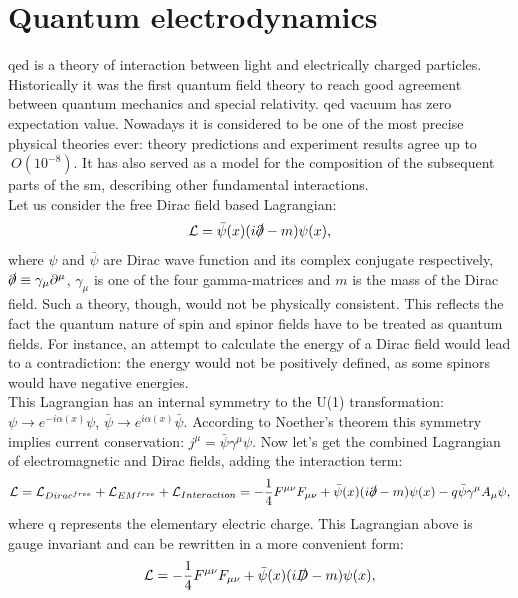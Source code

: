 \section{Quantum electrodynamics}
\label{sec::qed}
\gls{qed} is a theory of interaction between light and electrically charged particles. Historically it was the first quantum field theory to reach good agreement between quantum mechanics and special relativity. \gls{qed} vacuum has zero expectation value.  Nowadays it is considered to be one of the most precise physical theories ever: theory predictions and experiment results agree up to $~O(10^{-8})$. It has also served as a model for the composition of the subsequent parts of the \gls{sm}, describing other fundamental interactions.\\
Let us consider the free Dirac field based Lagrangian:
 \begin{equation}
\mathcal{L} = \bar \psi(x) (i\slashed\partial - m)\psi(x),
\end{equation}
where $\psi$ and $\bar \psi$ are Dirac wave function and its complex conjugate respectively, $\slashed\partial \equiv \gamma_{\mu}\partial^{\mu}$, $\gamma_{\mu}$ is one of the four gamma-matrices and $m$ is the mass of the Dirac field. 
Such a theory, though, would not be physically consistent. This reflects the fact the quantum nature of spin and spinor fields have to be treated as quantum fields. For instance, an attempt to calculate the energy of a Dirac field would lead to a contradiction: the energy would not be positively defined, as some spinors would have negative energies. \\
This Lagrangian has an internal symmetry to the U(1) transformation: $\psi\rightarrow e^{-i\alpha(x)}\psi$, \: $\bar\psi\rightarrow e^{i\alpha(x)}\bar\psi$. According to Noether's theorem this symmetry implies current conservation: $j^{\mu}=\bar\psi\gamma^{\mu}\psi$.
Now let's get the combined Lagrangian of electromagnetic and Dirac fields, adding the interaction term:
 \begin{equation}
\mathcal{L} = \mathcal{L}_{Dirac^{free}} + \mathcal{L}_{EM^{free}} + \mathcal{L}_{Interaction} = -\frac{1}{4} F^{\mu \nu}F_{\mu \nu}+\bar \psi(x) (i\slashed\partial -m)\psi(x) - q\bar\psi\gamma^{\mu}A_{\mu}\psi,
\end{equation}
where q represents the elementary electric charge. This Lagrangian above is gauge invariant and can be rewritten in a more convenient form:
 \begin{equation}
\mathcal{L} =  -\frac{1}{4} F^{\mu \nu}F_{\mu \nu}+\bar \psi(x) (i\slashed D -m)\psi(x),
\end{equation}
